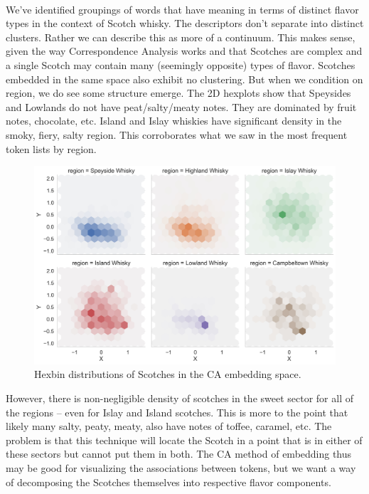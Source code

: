 \documentclass{article}
\begin{document}
\paragraph{}
We've identified groupings of words that have meaning in terms of distinct flavor types in the context of Scotch whisky. The descriptors don't separate into distinct clusters. Rather we can describe this as more of a continuum. This makes sense, given the way Correspondence Analysis works and that Scotches are complex and a single Scotch may contain many (seemingly opposite) types of flavor. Scotches embedded in the same space also exhibit no clustering. But when we condition on region, we do see some structure emerge. The 2D hexplots show that Speysides and Lowlands do not have peat/salty/meaty notes. They are dominated by fruit notes, chocolate, etc. Island and Islay whiskies have significant density in the smoky, fiery, salty region. This corroborates what we saw in the most frequent token lists by region.
		 	 \begin{figure}[H]
	\begin{center}
		\includegraphics[totalheight=8cm]{../images/EDA/CA_scotch_hexdistbyregion}
	\end{center}
	\caption{Hexbin distributions of Scotches in the CA embedding space.}
\end{figure}
However, there is non-negligible density of scotches in the sweet sector for all of the regions -- even for Islay and Island scotches. This is more to the point that likely many salty, peaty, meaty, also have notes of toffee, caramel, etc. The problem is that this technique will locate the Scotch in a point that is in either of these sectors but cannot put them in both. The CA method of embedding thus may be good for visualizing the associations between tokens, but we want a way of decomposing the Scotches themselves into respective flavor components.
\end{document}
